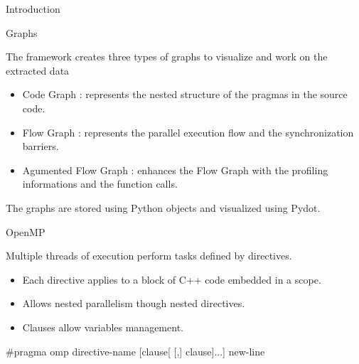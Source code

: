 \documentclass[xcolor=dvipsnames]{beamer}
\begin{document}
\begin{section}{Introduction}
\begin{frame}{\hskip 0.3cm }
\end{frame}









\begin{frame}{\hskip 0.3cm Graphs}


The framework creates three types of graphs to visualize and work on the extracted data 


\begin{itemize}		

\item Code Graph : represents the nested structure of the pragmas in the source code.

\item Flow Graph : represents the parallel execution flow and the synchronization barriers.

\item Agumented Flow Graph : enhances the Flow Graph with the profiling informations and the function calls.


\end{itemize}			

The graphs are stored using Python objects and visualized using Pydot.



\end{frame}








\begin{frame}{\hskip 0.3cm OpenMP }

Multiple threads of execution perform tasks defined by directives.

\begin{itemize}
\item Each directive applies to  a block of C++ code embedded in a scope.

\item Allows nested parallelism though nested directives.

\item Clauses allow variables management.
\end{itemize}

\begin{block}

$\#$pragma omp directive-name [clause[ [,] clause]...] new-line

\end{block}


\end{frame}
\end{section}
\end{document}
